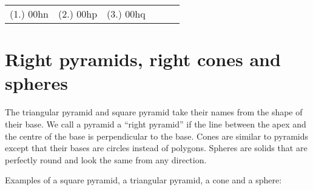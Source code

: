 \begin{exercises}{}
{\begin{center}
\end{center}
\practiceinfo
\begin{tabular}{cccccc}
(1.) 00hn&	(2.) 00hp& (3.) 00hq
\end{tabular}
}
\end{exercises}

\section{Right pyramids, right cones and spheres}

The triangular pyramid and square pyramid take their names from the
shape of their base. We call a pyramid a ``right pyramid'' if the line
between the apex and the centre of the base is perpendicular to the
base. Cones are similar to pyramids except that their bases are circles
instead of polygons. Spheres are solids that are perfectly round and look the same from any
direction.\par
Examples of a square pyramid, a triangular pyramid, a cone and a sphere:
